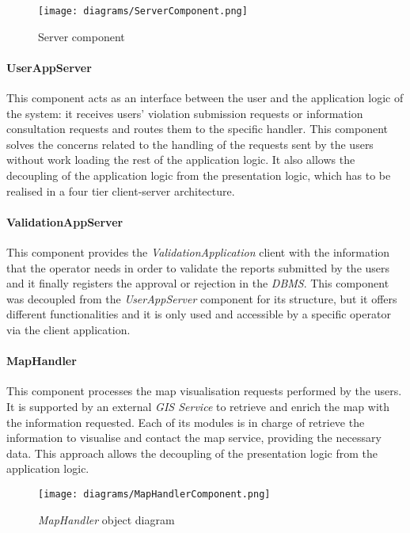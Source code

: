 \begin{figure}[h]
	\centering
	\texttt{[image: diagrams/ServerComponent.png]}
	\caption{
	\label{fig:ServerComponent} 
		Server component
	}
\end{figure}

\paragraph{UserAppServer}
This component acts as an interface between the user and the application logic of the system: it receives users' violation submission requests or information consultation requests and routes them to the specific handler. This component solves the concerns related to the handling of the requests sent by the users without work loading the rest of the application logic. It also allows the decoupling of the application logic from the presentation logic, which has to be realised in a four tier client-server architecture.
\paragraph{ValidationAppServer}
This component provides the \textit{ValidationApplication} client with the information that the operator needs in order to validate the reports submitted by the users and it finally registers the approval or rejection in the \textit{DBMS}. This component was decoupled from the \textit{UserAppServer} component for its structure, but it offers different functionalities and it is only used and accessible by a specific operator via the client application.
\paragraph{MapHandler}
This component processes the map visualisation requests performed by the users. It is supported by an external \textit{GIS Service} to retrieve and enrich the map with the information requested. Each of its modules is in charge of retrieve the information to visualise and contact the map service, providing the necessary data. This approach allows the decoupling of the presentation logic from the application logic.\newline\newline
\begin{figure}[h!]
	\centering
	\texttt{[image: diagrams/MapHandlerComponent.png]}
	\caption{
		\label{fig:mapHandlerComponentDiagram} 
		\emph{MapHandler} object diagram
	}
\end{figure}
